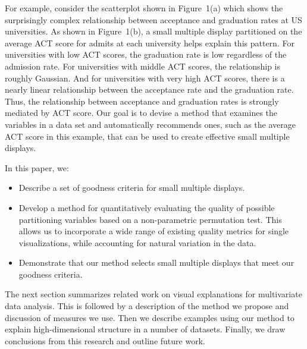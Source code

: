 
For example, consider the scatterplot shown in Figure~1(a) which shows the surprisingly complex relationship between acceptance and graduation rates at US universities.
As shown in Figure~1(b), a small multiple display partitioned on the average ACT score for admits at each university helps explain this pattern.
For universities with low ACT scores, the graduation rate is low regardless of the admission rate.
For universities with middle ACT scores, the relationship is roughly Gaussian.
And for universities with very high ACT scores, there is a nearly linear relationship between the acceptance rate and the graduation rate.
Thus, the relationship between acceptance and graduation rates is strongly mediated by ACT score.
Our goal is to devise a method that examines the variables in a data set and automatically recommends ones, such as the average ACT score in this example, that can be used to create effective small multiple displays.


In this paper, we:
\begin{itemize}
    \item Describe a set of goodness criteria for small multiple displays.
    \item Develop a method for quantitatively evaluating the quality of possible partitioning variables based on a non-parametric permutation test. This allows us to incorporate a wide range of existing quality metrics for single visualizations, while accounting for natural variation in the data.
    \item Demonstrate that our method selects small multiple displays that meet our goodness criteria.
\end{itemize}

The next section summarizes related work on visual explanations for multivariate data analysis. This is followed by a description of the method we propose and discussion of measures we use. Then we describe examples using our method to explain high-dimensional structure in a number of datasets. Finally, we draw conclusions from this research and outline future work.

